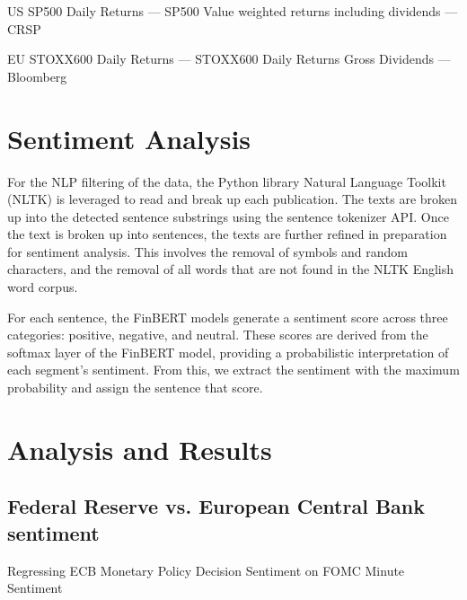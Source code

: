 \documentclass[12pt, letterpaper]{article}
\begin{document}
US SP500 Daily Returns — SP500 Value weighted returns including dividends — CRSP

EU STOXX600 Daily Returns — STOXX600 Daily Returns Gross Dividends — Bloomberg

\section{Sentiment Analysis}
For the NLP filtering of the data, the Python library Natural Language Toolkit (NLTK) is leveraged to read and break up each publication. The texts are broken up into the detected sentence substrings using the sentence tokenizer API. Once the text is broken up into sentences, the texts are further refined in preparation for sentiment analysis. This involves the removal of symbols and random characters, and the removal of all words that are not found in the NLTK English word corpus.  

For each sentence, the FinBERT models generate a sentiment score across three categories: positive, negative, and neutral. These scores are derived from the softmax layer of the FinBERT model, providing a probabilistic interpretation of each segment's sentiment. From this, we extract the sentiment with the maximum probability and assign the sentence that score.

\section{Analysis and Results}

\subsection{Federal Reserve vs. European Central Bank sentiment}

Regressing ECB Monetary Policy Decision Sentiment on FOMC Minute Sentiment
\end{document}
